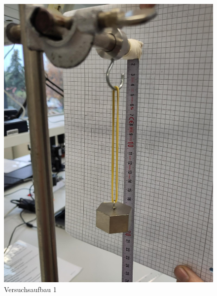 \documentclass[
  9pt,
]{article}
\begin{document}
\begin{figure}
\centering
\includegraphics[width=\textwidth,height=0.2\textheight]{Bilder/V1B1.jpeg}
\caption{Versuchsaufbau 1}
\end{figure}
\end{document}
